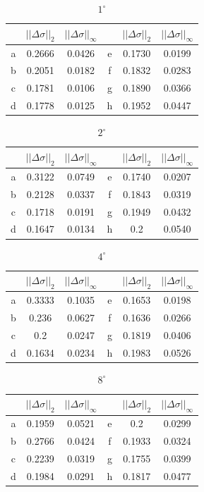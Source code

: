 \documentclass{procDDs}
\begin{document}
\begin{table}[h!]
	\begin{tabular}{|c|c|c||c|c|c|}
		\hline
		& $||\Delta\sigma||_2$ & $||\Delta\sigma||_\infty$ &
		& $||\Delta\sigma||_2$ & $||\Delta\sigma||_\infty$ \\ \hline
		a & 0.2666 & 0.0426 & e &  0.1730 & 0.0199\\ \hline
		b & 0.2051 & 0.0182 & f &  0.1832 & 0.0283\\ \hline
		c & 0.1781 & 0.0106 & g &  0.1890 & 0.0366\\ \hline
		d & 0.1778 & 0.0125 & h &  0.1952 & 0.0447\\ \hline
	\end{tabular}
	\label{table:desc1}
	\caption{$1^\circ$}
\end{table}
\begin{table}[h!]
	\begin{tabular}{|c|c|c||c|c|c|}
		\hline
		& $||\Delta\sigma||_2$ & $||\Delta\sigma||_\infty$ &
		& $||\Delta\sigma||_2$ & $||\Delta\sigma||_\infty$ \\ \hline
		a & 0.3122 & 0.0749 & e &  0.1740 & 0.0207\\ \hline
		b & 0.2128 & 0.0337 & f &  0.1843 & 0.0319\\ \hline
		c & 0.1718 & 0.0191 & g &  0.1949 & 0.0432\\ \hline
		d & 0.1647 & 0.0134 & h &  0.2 & 0.0540\\ \hline
	\end{tabular}
	\label{table:desc2}
	\caption{$2^\circ$}	
\end{table}
\begin{table}[h!]
	\begin{tabular}{|c|c|c||c|c|c|}
		\hline
		& $||\Delta\sigma||_2$ & $||\Delta\sigma||_\infty$ &
		& $||\Delta\sigma||_2$ & $||\Delta\sigma||_\infty$ \\ \hline
		a & 0.3333 & 0.1035 & e &  0.1653 & 0.0198\\ \hline
		b & 0.236 & 0.0627 & f &  0.1636 & 0.0266\\ \hline
		c & 0.2 & 0.0247 & g &  0.1819 & 0.0406\\ \hline
		d & 0.1634 & 0.0234 & h &  0.1983 & 0.0526\\ \hline
	\end{tabular}
	\label{table:desc3}
	\caption{$4^\circ$}	
\end{table}
\begin{table}[h!]
	\begin{tabular}{|c|c|c||c|c|c|}
		\hline
		& $||\Delta\sigma||_2$ & $||\Delta\sigma||_\infty$ &
		& $||\Delta\sigma||_2$ & $||\Delta\sigma||_\infty$ \\ \hline
		a & 0.1959 & 0.0521 & e &  0.2 & 0.0299\\ \hline
		b & 0.2766 & 0.0424 & f &  0.1933 & 0.0324\\ \hline
		c & 0.2239 & 0.0319 & g &  0.1755 & 0.0399\\ \hline
		d & 0.1984 & 0.0291 & h &  0.1817 & 0.0477\\ \hline
	\end{tabular}
	\label{table:desc4}
	\caption{$8^\circ$}
\end{table}
\end{document}
